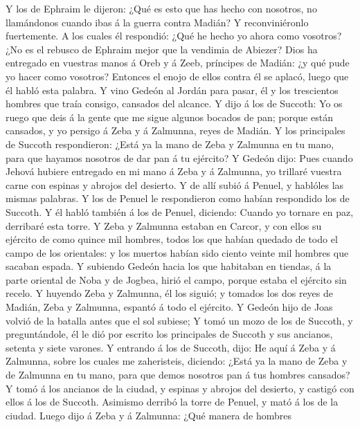  Y los de Ephraim le dijeron: ¿Qué es esto que has hecho con
nosotros, no llamándonos cuando ibas á la guerra contra Madián? Y
reconviniéronlo fuertemente.  A los cuales él respondió:
¿Qué he hecho yo ahora como vosotros? ¿No es el rebusco de Ephraim mejor
que la vendimia de Abiezer?  Dios ha entregado en vuestras
manos á Oreb y á Zeeb, príncipes de Madián: ¿y qué pude yo hacer como
vosotros? Entonces el enojo de ellos contra él se aplacó, luego que él
habló esta palabra.  Y vino Gedeón al Jordán para pasar, él
y los trescientos hombres que traía consigo, cansados del alcance.
 Y dijo á los de Succoth: Yo os ruego que deis á la gente
que me sigue algunos bocados de pan; porque están cansados, y yo persigo
á Zeba y á Zalmunna, reyes de Madián.  Y los principales de
Succoth respondieron: ¿Está ya la mano de Zeba y Zalmunna en tu mano,
para que hayamos nosotros de dar pan á tu ejército?  Y
Gedeón dijo: Pues cuando Jehová hubiere entregado en mi mano á Zeba y á
Zalmunna, yo trillaré vuestra carne con espinas y abrojos del desierto.
 Y de allí subió á Penuel, y hablóles las mismas palabras. Y
los de Penuel le respondieron como habían respondido los de Succoth.
 Y él habló también á los de Penuel, diciendo: Cuando yo
tornare en paz, derribaré esta torre.  Y Zeba y Zalmunna
estaban en Carcor, y con ellos su ejército de como quince mil hombres,
todos los que habían quedado de todo el campo de los orientales: y los
muertos habían sido ciento veinte mil hombres que sacaban espada.
 Y subiendo Gedeón hacia los que habitaban en tiendas, á la
parte oriental de Noba y de Jogbea, hirió el campo, porque estaba el
ejército sin recelo.  Y huyendo Zeba y Zalmunna, él los
siguió; y tomados los dos reyes de Madián, Zeba y Zalmunna, espantó á
todo el ejército.  Y Gedeón hijo de Joas volvió de la
batalla antes que el sol subiese;  Y tomó un mozo de los de
Succoth, y preguntándole, él le dió por escrito los principales de
Succoth y sus ancianos, setenta y siete varones.  Y
entrando á los de Succoth, dijo: He aquí á Zeba y á Zalmunna, sobre los
cuales me zaheristeis, diciendo: ¿Está ya la mano de Zeba y de Zalmunna
en tu mano, para que demos nosotros pan á tus hombres cansados?
 Y tomó á los ancianos de la ciudad, y espinas y abrojos
del desierto, y castigó con ellos á los de Succoth. 
Asimismo derribó la torre de Penuel, y mató á los de la ciudad.
 Luego dijo á Zeba y á Zalmunna: ¿Qué manera de hombres
